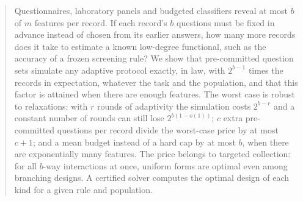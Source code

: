 \documentclass{article}
\begin{document}
\printAffiliationsAndNotice{}

\begin{abstract}
Questionnaires, laboratory panels and budgeted classifiers reveal at most $b$ of $m$ features per record. If each record's $b$ questions must be fixed in advance instead of chosen from its earlier answers, how many more records does it take to estimate a known low-degree functional, such as the accuracy of a frozen screening rule? We show that pre-committed question sets simulate any adaptive protocol exactly, in law, with $2^{b-1}$ times the records in expectation, whatever the task and the population, and that this factor is attained when there are enough features. The worst case is robust to relaxations: with $r$ rounds of adaptivity the simulation costs $2^{b-r}$ and a constant number of rounds can still lose $2^{b(1-o(1))}$; $c$ extra pre-committed questions per record divide the worst-case price by at most $c+1$; and a mean budget instead of a hard cap by at most $b$, when there are exponentially many features. The price belongs to targeted collection: for all $b$-way interactions at once, uniform forms are optimal even among branching designs. A certified solver computes the optimal design of each kind for a given rule and population. \nAbstractData
\end{abstract}
\end{document}
